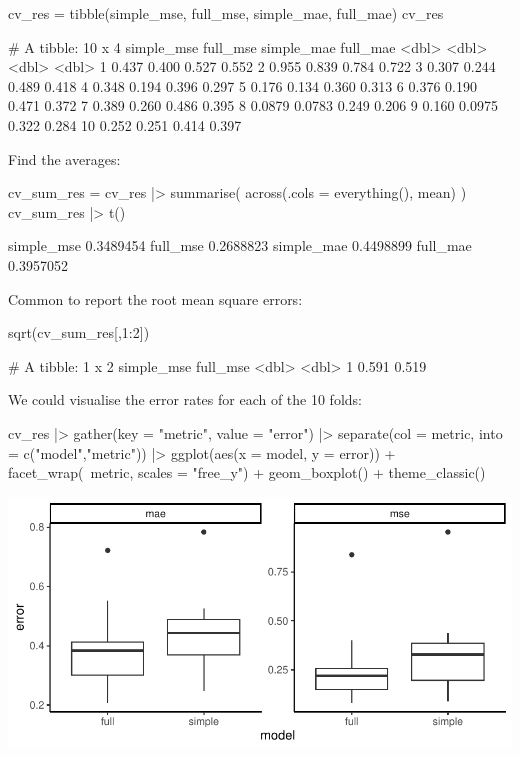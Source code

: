 \documentclass[a4paper]{article}
\begin{document}
\begin{Schunk}
\begin{Sinput}
cv_res = tibble(simple_mse, full_mse, 
                simple_mae, full_mae)
cv_res
\end{Sinput}
\begin{Soutput}
# A tibble: 10 x 4
   simple_mse full_mse simple_mae full_mae
        <dbl>    <dbl>      <dbl>    <dbl>
 1     0.437    0.400       0.527    0.552
 2     0.955    0.839       0.784    0.722
 3     0.307    0.244       0.489    0.418
 4     0.348    0.194       0.396    0.297
 5     0.176    0.134       0.360    0.313
 6     0.376    0.190       0.471    0.372
 7     0.389    0.260       0.486    0.395
 8     0.0879   0.0783      0.249    0.206
 9     0.160    0.0975      0.322    0.284
10     0.252    0.251       0.414    0.397
\end{Soutput}
\end{Schunk}
Find the averages:
\begin{Schunk}
\begin{Sinput}
cv_sum_res = cv_res |> 
  summarise(
    across(.cols = everything(), 
           mean)
  )
cv_sum_res |> t()
\end{Sinput}
\begin{Soutput}
                [,1]
simple_mse 0.3489454
full_mse   0.2688823
simple_mae 0.4498899
full_mae   0.3957052
\end{Soutput}
\end{Schunk}
Common to report the root mean square errors:
\begin{Schunk}
\begin{Sinput}
sqrt(cv_sum_res[,1:2])
\end{Sinput}
\begin{Soutput}
# A tibble: 1 x 2
  simple_mse full_mse
       <dbl>    <dbl>
1      0.591    0.519
\end{Soutput}
\end{Schunk}
We could visualise the error rates for each of the 10 folds:
\begin{Schunk}
\begin{Sinput}
cv_res |> gather(key = "metric", value = "error") |> 
  separate(col = metric, into = c("model","metric")) |> 
  ggplot(aes(x = model, y = error)) + facet_wrap(~metric, scales = "free_y") + 
  geom_boxplot() +
  theme_classic()
\end{Sinput}


{\centering \includegraphics[width=\maxwidth]{figure/listings-unnamed-chunk-406-1} 

}

\end{Schunk}
\end{document}
